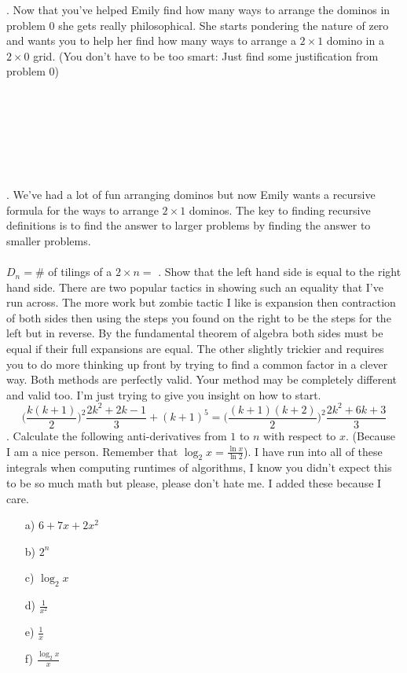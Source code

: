 \documentclass[12pt]{article}
\begin{document}
. Now that you've helped Emily find how many ways to arrange the dominos in problem 0 she gets really philosophical. She starts pondering the nature of zero and wants you to help her find how many ways to arrange a $2 \times 1$ domino in a $2 \times 0$ grid. (You don't have to be too smart: Just find some justification from problem 0)\\\\\\\\\\\\\\\\
. We've had a lot of fun arranging dominos but now Emily wants a recursive formula for the ways to arrange $2 \times 1$ dominos. The key to finding recursive definitions is to find the answer to larger problems by finding the answer to smaller problems.\\\\
$D_n = $\# of tilings of a $2 \times n =$
\newpage
{}. Show that the left hand side is equal to the right hand side. 
There are two popular tactics in showing such an equality that I've run across. 
The more work but zombie tactic I like is expansion then contraction of both sides then using
the steps you found on the right to be the steps for the left but in reverse. By the fundamental theorem of algebra
both sides must be equal if their full expansions are equal. The other slightly
trickier and requires you to do more thinking up front by trying to find a common factor
in a clever way. Both methods are perfectly valid. Your method may be completely different and valid too.
I'm just trying to give you insight on how to start.
$$\bigg(\frac{k(k + 1)}{2}\bigg)^2\frac{2k^2+2k-1}{3} + (k + 1)^5=\big(\frac{(k+1)(k + 2)}{2}\big)^2\frac{2k^2+6k+3}{3} $$
\newpage
{}. Calculate the following anti-derivatives from $1$ to $n$ with respect to $x$. (Because I am a nice person. Remember that $\log_2{x}=\frac{\ln{x}}{\ln{2}}$). I have run into all of these integrals when computing runtimes of algorithms, I know you didn't expect this to be so much math but please, please don't hate me. I added these because I care.
\begin{enumerate}
    \item[a)]$6+7x+2x^2$
    \item[b)]$2^n$
    \item[c)]$\log_{2}{x}$
    \item[d)]$\frac{1}{x^2}$
    \item[e)]$\frac{1}{x}$
    \item[f)]$\frac{\log_{2}{x}}{x}$
\end{enumerate}
\end{document}
